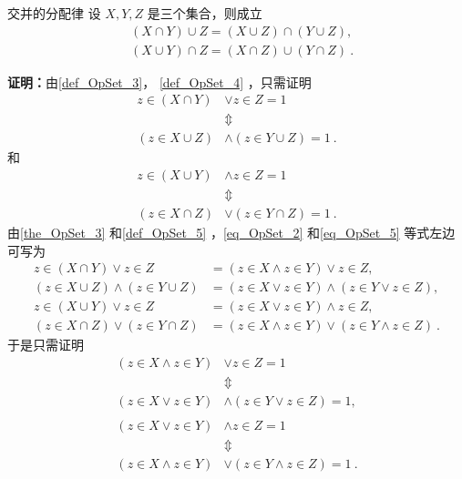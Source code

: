 \begin{theorem}{交并的分配律}
设 $X,Y,Z$ 是三个集合，则成立
\begin{equation}
\begin{aligned}
&(X\cap Y)\cup Z=(X\cup Z)\cap (Y\cup Z),\\
&(X\cup Y)\cap Z=(X\cap Z)\cup (Y\cap Z)~.
\end{aligned}
\end{equation}
\end{theorem}
\textbf{证明：}由\autoref{def_OpSet_3}， \autoref{def_OpSet_4} ，只需证明
\begin{equation}\label{eq_OpSet_2}
\begin{aligned}
z\in (X\cap Y)&\lor z\in Z=1\\
&\Updownarrow\\
 (z\in X\cup Z)&\land (z\in Y\cup Z)=1~.
 \end{aligned}
 \end{equation}
 和 
 \begin{equation}\label{eq_OpSet_5}
\begin{aligned}
z\in (X\cup Y)&\land z\in Z=1\\
&\Updownarrow\\
 (z\in X\cap Z)&\lor (z\in Y\cap Z)=1~.
 \end{aligned}
 \end{equation}
由\autoref{the_OpSet_3} 和\autoref{def_OpSet_5} ，\autoref{eq_OpSet_2}  和\autoref{eq_OpSet_5} 等式左边可写为
\begin{equation}
\begin{aligned}
z\in (X\cap Y)\lor z\in Z&=(z\in X\land z\in Y)\lor z\in Z,\\
(z\in X\cup Z)\land (z\in Y\cup Z)&=(z\in X\lor z\in Y)\land (z\in Y\lor z\in Z),\\
z\in (X\cup Y)\lor z\in Z&=(z\in X\lor z\in Y)\land z\in Z,\\
(z\in X\cap Z)\lor (z\in Y\cap Z)&=(z\in X\land z\in Y)\lor (z\in Y\land z\in Z)~.
\end{aligned}
\end{equation}
于是只需证明 
\begin{equation}\label{eq_OpSet_8}
\begin{aligned}
(z\in X\land z\in Y)&\lor z\in Z=1\\
&\Updownarrow\\
(z\in X\lor z\in Y)&\land (z\in Y\lor z\in Z)=1,\\
\\
(z\in X\lor z\in Y)&\land z\in Z=1\\
&\Updownarrow\\
(z\in X\land z\in Y)&\lor (z\in Y\land z\in Z)=1~.
\end{aligned}
\end{equation}

